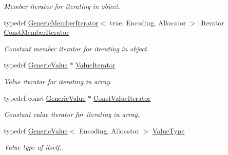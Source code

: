 \begin{DoxyCompactItemize}
\begin{DoxyCompactList}\small\item\em Member iterator for iterating in object. \end{DoxyCompactList}\item 
typedef \hyperlink{class_generic_member_iterator}{Generic\+Member\+Iterator}$<$ true, Encoding, Allocator $>$\+::Iterator \hyperlink{class_generic_value_aac08c3e660a9036d3dcb8b10ff6c61f4}{Const\+Member\+Iterator}\hypertarget{class_generic_value_aac08c3e660a9036d3dcb8b10ff6c61f4}{}\label{class_generic_value_aac08c3e660a9036d3dcb8b10ff6c61f4}

\begin{DoxyCompactList}\small\item\em Constant member iterator for iterating in object. \end{DoxyCompactList}\item 
typedef \hyperlink{class_generic_value}{Generic\+Value} $\ast$ \hyperlink{class_generic_value_aee30721a49688ba0f865f5d581eb6be9}{Value\+Iterator}\hypertarget{class_generic_value_aee30721a49688ba0f865f5d581eb6be9}{}\label{class_generic_value_aee30721a49688ba0f865f5d581eb6be9}

\begin{DoxyCompactList}\small\item\em Value iterator for iterating in array. \end{DoxyCompactList}\item 
typedef const \hyperlink{class_generic_value}{Generic\+Value} $\ast$ \hyperlink{class_generic_value_a49010c6d6886f96ff0b0c51bccc7f6ea}{Const\+Value\+Iterator}\hypertarget{class_generic_value_a49010c6d6886f96ff0b0c51bccc7f6ea}{}\label{class_generic_value_a49010c6d6886f96ff0b0c51bccc7f6ea}

\begin{DoxyCompactList}\small\item\em Constant value iterator for iterating in array. \end{DoxyCompactList}\item 
typedef \hyperlink{class_generic_value}{Generic\+Value}$<$ Encoding, Allocator $>$ \hyperlink{class_generic_value_a43a39bb4fca9b9d3de3da6ac353d25ce}{Value\+Type}\hypertarget{class_generic_value_a43a39bb4fca9b9d3de3da6ac353d25ce}{}\label{class_generic_value_a43a39bb4fca9b9d3de3da6ac353d25ce}

\begin{DoxyCompactList}\small\item\em Value type of itself. \end{DoxyCompactList}\end{DoxyCompactItemize}
